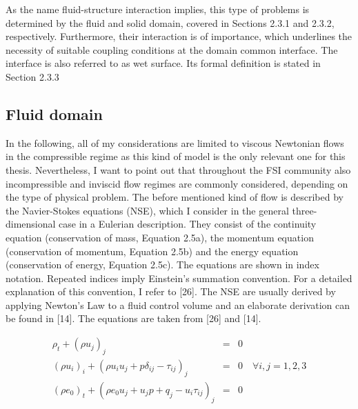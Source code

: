 As the name fluid-structure interaction implies, this type of problems is determined by the fluid and solid
domain, covered in Sections 2.3.1 and 2.3.2, respectively. Furthermore, their interaction is of importance,
which underlines the necessity of suitable coupling conditions at the domain common interface. The
interface is also referred to as wet surface. Its formal definition is stated in Section 2.3.3

\subsection{Fluid domain}

In the following, all of my considerations are limited to viscous Newtonian flows in the compressible
regime as this kind of model is the only relevant one for this thesis. Nevertheless, I want to point out that
throughout the FSI community also incompressible and inviscid flow regimes are commonly considered,
depending on the type of physical problem.
The before mentioned kind of flow is described by the Navier-Stokes equations (NSE), which I consider
in the general three-dimensional case in a Eulerian description. They consist of the continuity equation
(conservation of mass, Equation 2.5a), the momentum equation (conservation of momentum, Equation
2.5b) and the energy equation (conservation of energy, Equation 2.5c). The equations are shown in index
notation. Repeated indices imply Einstein’s summation convention. For a detailed explanation of this
convention, I refer to [26]. The NSE are usually derived by applying Newton’s Law to a fluid control
volume and an elaborate derivation can be found in [14]. The equations are taken from [26] and [14].

\begin{eqnarray}
	\rho_t + \left(\rho u_j\right)_j &=&  0 \\
	\left(\rho u_i\right)_i + \left(\rho u_i u_j +p\delta_{ij} -\tau_{ij}\right)_j &=& 0 \quad \forall i,j = 1,2,3 \\
	\left(\rho e_0\right)_t + \left(\rho e_0 u_j +u_jp + q_j -u_i \tau_{ij}\right)_j &=& 0
\end{eqnarray}



